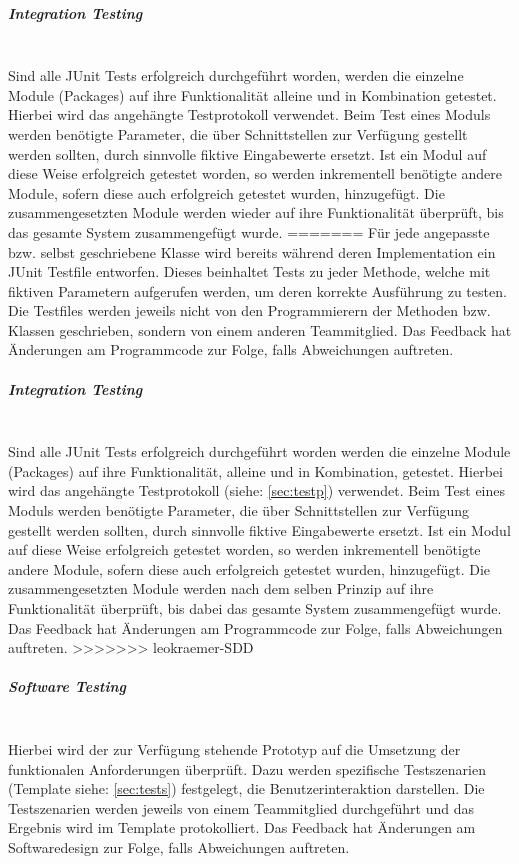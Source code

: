 \documentclass[10pt,a4paper]{article}
\begin{document}
\begin{itemize}
\subparagraph{Integration Testing}\ \\
Sind alle JUnit Tests erfolgreich durchgeführt worden, werden die einzelne Module (Packages) auf ihre Funktionalität alleine und in Kombination getestet. Hierbei wird das angehängte Testprotokoll verwendet. Beim Test eines Moduls werden benötigte Parameter, die über Schnittstellen zur Verfügung gestellt werden sollten, durch sinnvolle fiktive Eingabewerte ersetzt. Ist ein Modul auf diese Weise erfolgreich getestet worden, so werden inkrementell benötigte andere Module, sofern diese auch erfolgreich getestet wurden, hinzugefügt. Die zusammengesetzten Module werden wieder auf ihre Funktionalität überprüft, bis das gesamte System zusammengefügt wurde.
=======
Für jede angepasste bzw. selbst geschriebene Klasse wird bereits während deren Implementation ein JUnit Testfile entworfen. Dieses beinhaltet Tests zu jeder Methode, welche mit fiktiven Parametern aufgerufen werden, um deren korrekte Ausführung zu testen. Die Testfiles werden jeweils nicht von den Programmierern der Methoden bzw. Klassen geschrieben, sondern von einem anderen Teammitglied. Das Feedback hat Änderungen am Programmcode zur Folge, falls Abweichungen auftreten.

\subparagraph{Integration Testing}\ \\
Sind alle JUnit Tests erfolgreich durchgeführt worden werden die einzelne Module (Packages) auf ihre Funktionalität, alleine und in Kombination, getestet. Hierbei wird das angehängte Testprotokoll (siehe: \autoref{sec:testp}) verwendet. Beim Test eines Moduls werden benötigte Parameter, die über Schnittstellen zur Verfügung gestellt werden sollten, durch sinnvolle fiktive Eingabewerte ersetzt. Ist ein Modul auf diese Weise erfolgreich getestet worden, so werden inkrementell benötigte andere Module, sofern diese auch erfolgreich getestet wurden, hinzugefügt. Die zusammengesetzten Module werden nach dem selben Prinzip auf ihre Funktionalität überprüft, bis dabei das gesamte System zusammengefügt wurde. Das Feedback hat Änderungen am Programmcode zur Folge, falls Abweichungen auftreten.
>>>>>>> leokraemer-SDD

\subparagraph{Software Testing}\ \\
Hierbei wird der zur Verfügung stehende Prototyp auf die Umsetzung der funktionalen Anforderungen überprüft. Dazu werden spezifische Testszenarien (Template siehe: \autoref{sec:tests}) festgelegt, die Benutzerinteraktion darstellen. Die Testszenarien werden jeweils von einem Teammitglied durchgeführt und das Ergebnis wird im Template protokolliert. Das Feedback hat Änderungen am Softwaredesign zur Folge, falls Abweichungen auftreten.


\end{itemize}
\end{document}
